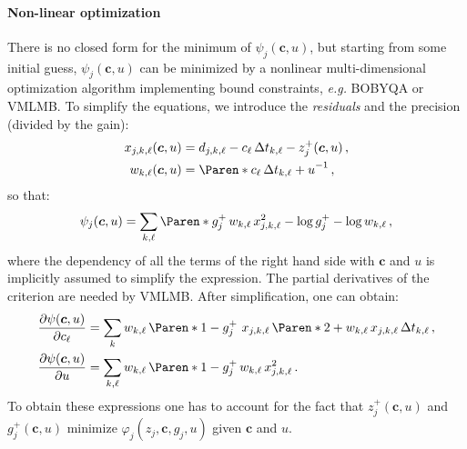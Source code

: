 \documentclass[a4paper,11pt,twoside]{scrartcl}
\newcommand*{\eg}{\emph{e.g.}\xspace}
\newcommand*{\PDer}[2]{\frac{\partial#1}{\partial#2}}
\newcommand*{\V}[1]{\boldsymbol{#1}}   %
\theoremstyle{plain} %
\theoremstyle{definition}
\theoremstyle{remark}
\begin{document}
\paragraph{Non-linear optimization}
There is no closed form for the minimum of $\psi_j(\V c, u)$, but starting from
some initial guess, $\psi_j(\V c, u)$ can be minimized by a nonlinear
multi-dimensional optimization algorithm implementing bound constraints, \eg
BOBYQA or VMLMB. To simplify the equations, we introduce the \emph{residuals}
and the precision (divided by the gain):
\begin{align}
  x_{j,k,\ell}(\V c, u)
  &= d_{j,k,\ell} - c_{\ell}\,\Delta t_{k,\ell} - z^+_j(\V c, u) \,, \\
  w_{k,\ell}(\V c, u)
  &= \Paren*{c_{\ell}\,\Delta t_{k,\ell} + u}^{-1}\,,
\end{align}
so that:
\begin{equation}
  \psi_j(\V c, u) = \sum_{k,\ell} \Paren*{
    g^+_j\,w_{k,\ell}\,x_{j,k,\ell}^2 - \log g^+_j - \log w_{k,\ell}
 } \, ,
\end{equation}
where the dependency of all the terms of the right hand side with $\V c$ and
$u$ is implicitly assumed to simplify the expression. The partial derivatives
of the criterion are needed by VMLMB. After simplification, one can obtain:
\begin{align}
  \PDer{\psi(\V c, u)}{c_{\ell}}
  &=\sum_{k} w_{k,\ell}\,\Paren*{
    1 - g^+_j\,\,x_{j,k,\ell}\,\Paren*{2 + w_{k,\ell}\,x_{j,k,\ell}}
  }\,\Delta t_{k,\ell} \,,\\
  \PDer{\psi(\V c, u)}{u}
  &= \sum_{k,\ell} w_{k,\ell}\,\Paren*{
    1 - g^+_j\,w_{k,\ell} \, x_{j,k,\ell}^2
  } \,.
\end{align}
To obtain these expressions one has to account for the fact that $z^+_j(\V c,
u)$ and $g^+_j(\V c, u)$ minimize $\varphi_j(z_j,\V c, g_j,u)$ given $\V c$ and
$u$.
\end{document}
